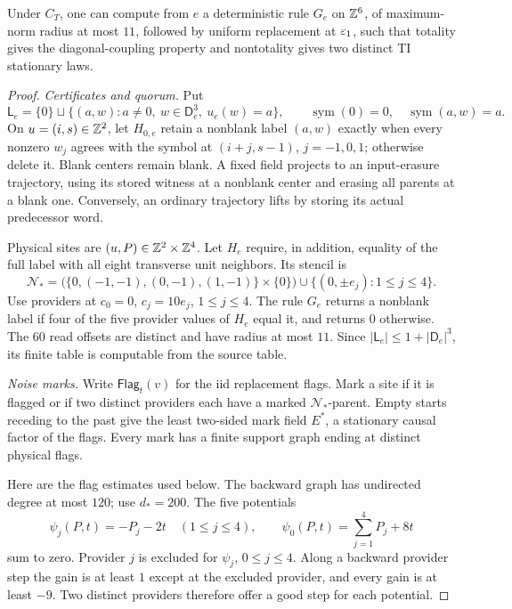 \begin{lemma}\label{lem:totality-controller}
Under \(C_T\), one can compute from \(e\) a deterministic rule
\(G_e\) on \(\mathbb Z^6\), of maximum-norm radius at most \(11\), followed
by uniform replacement at \(\varepsilon_1\), such that totality gives the
diagonal-coupling property and nontotality gives two distinct TI
stationary laws.
\end{lemma}
\begin{proof}
\emph{Certificates and quorum.}
Put
\[
 \mathsf L_e=\{0\}\sqcup
 \{(a,w):a\ne0,\ w\in\mathsf D_e^3,\ u_e(w)=a\},
 \qquad \operatorname{sym}(0)=0,\quad
 \operatorname{sym}(a,w)=a.
\]
On \(u=(i,s)\in\mathbb Z^2\), let \(H_{0,e}\) retain a nonblank
label \((a,w)\) exactly when every nonzero \(w_j\) agrees with
the symbol at \((i+j,s-1)\), \(j=-1,0,1\); otherwise delete it.
Blank centers remain blank. A fixed field projects to an
input-erasure trajectory, using its stored witness at a nonblank
center and erasing all parents at a blank one. Conversely, an
ordinary trajectory lifts by storing its actual predecessor word.

Physical sites are \((u,P)\in\mathbb Z^2\times\mathbb Z^4\).
Let \(H_e\) require, in addition, equality of the full label with
all eight transverse unit neighbors. Its stencil is
\[
 \mathcal N_*=
 \bigl(\{0,(-1,-1),(0,-1),(1,-1)\}\times\{0\}\bigr)
 \cup\{(0,\pm e_j):1\le j\le4\}.
\]
Use providers at \(c_0=0\), \(c_j=10e_j\), \(1\le j\le4\).
The rule \(G_e\) returns a nonblank label if four of the five
provider values of \(H_e\) equal it, and returns \(0\) otherwise.
The \(60\) read offsets are distinct and have radius at most \(11\).
Since \(|\mathsf L_e|\le1+|\mathsf D_e|^3\), its finite table is
computable from the source table.

\emph{Noise marks.}
Write \(\mathsf{Flag}_t(v)\) for the iid replacement flags. Mark a site if
it is flagged or if two distinct providers each have a marked
\(\mathcal N_*\)-parent. Empty starts receding to the past give
the least two-sided mark field \(E^*\), a stationary causal
factor of the flags. Every mark has a finite support graph
ending at distinct physical flags.

Here are the flag estimates used below. The backward graph has
undirected degree at most \(120\); use \(d_*=200\). The five
potentials
\[
 \psi_j(P,t)=-P_j-2t\quad(1\le j\le4),\qquad
 \psi_0(P,t)=\sum_{j=1}^4P_j+8t
\]
sum to zero. Provider \(j\) is excluded for \(\psi_j\),
\(0\le j\le4\). Along a backward provider step the gain is at least
\(1\) except at the excluded provider, and every gain
is at least \(-9\). Two distinct providers therefore offer a
good step for each potential.


\end{proof}
